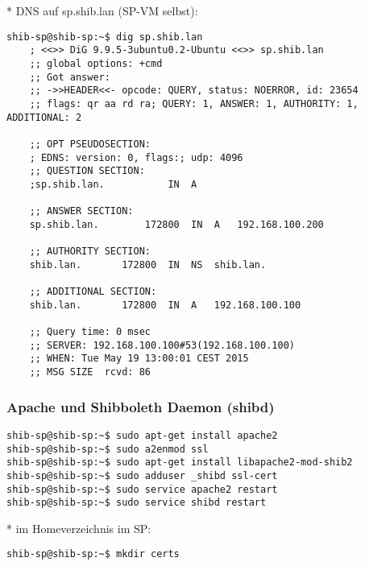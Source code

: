 * DNS auf sp.shib.lan (SP-VM selbst):
\begin{lstlisting}
shib-sp@shib-sp:~$ dig sp.shib.lan
	; <<>> DiG 9.9.5-3ubuntu0.2-Ubuntu <<>> sp.shib.lan
	;; global options: +cmd
	;; Got answer:
	;; ->>HEADER<<- opcode: QUERY, status: NOERROR, id: 23654
	;; flags: qr aa rd ra; QUERY: 1, ANSWER: 1, AUTHORITY: 1, ADDITIONAL: 2
	
	;; OPT PSEUDOSECTION:
	; EDNS: version: 0, flags:; udp: 4096
	;; QUESTION SECTION:
	;sp.shib.lan.			IN	A
	
	;; ANSWER SECTION:
	sp.shib.lan.		172800	IN	A	192.168.100.200
	
	;; AUTHORITY SECTION:
	shib.lan.		172800	IN	NS	shib.lan.
	
	;; ADDITIONAL SECTION:
	shib.lan.		172800	IN	A	192.168.100.100
	
	;; Query time: 0 msec
	;; SERVER: 192.168.100.100#53(192.168.100.100)
	;; WHEN: Tue May 19 13:00:01 CEST 2015
	;; MSG SIZE  rcvd: 86
\end{lstlisting}

\subsubsection{Apache und Shibboleth Daemon (shibd)}
\begin{lstlisting}
shib-sp@shib-sp:~$ sudo apt-get install apache2
shib-sp@shib-sp:~$ sudo a2enmod ssl
shib-sp@shib-sp:~$ sudo apt-get install libapache2-mod-shib2 
shib-sp@shib-sp:~$ sudo adduser _shibd ssl-cert
shib-sp@shib-sp:~$ sudo service apache2 restart
shib-sp@shib-sp:~$ sudo service shibd restart
\end{lstlisting} 
* im Homeverzeichnis im SP:
\begin{lstlisting}
shib-sp@shib-sp:~$ mkdir certs
\end{lstlisting}

